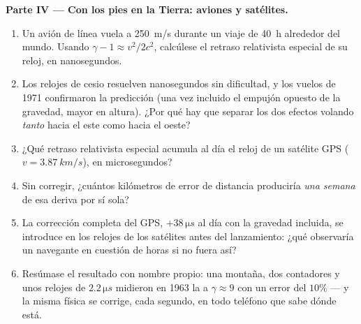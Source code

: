 \begin{problem}
\medskip\noindent\textbf{Parte IV --- Con los pies en la Tierra: aviones y
satélites.}
\begin{enumerate}[resume]
  \item Un avión de línea vuela a \qty{250}{m/s} durante un viaje de
        \qty{40}{h} alrededor del mundo. Usando $\gamma - 1 \approx v^2/2c^2$,
        calcúlese el retraso relativista especial de su reloj, en
        nanosegundos.
  \item Los relojes de cesio resuelven nanosegundos sin dificultad, y
        los vuelos de 1971 confirmaron la predicción (una vez incluido
        el empujón opuesto de la gravedad, mayor en altura). ¿Por qué
        hay que separar los dos efectos volando \emph{tanto} hacia el
        este como hacia el oeste?
  \item ¿Qué retraso relativista especial acumula al día el reloj de un
        satélite GPS ($v = \qty{3.87}{km/s}$), en microsegundos?
  \item Sin corregir, ¿cuántos kilómetros de error de distancia
        produciría \emph{una semana} de esa deriva por sí sola?
  \item La corrección completa del GPS, $+38\,\unit{\micro s}$ al día
        con la gravedad incluida, se introduce en los relojes de los
        satélites antes del lanzamiento: ¿qué observaría un navegante
        en cuestión de horas si no fuera así?
  \item Resúmase el resultado con nombre propio: una montaña, dos
        contadores y unos relojes de $2.2\,\unit{\micro s}$ midieron en
        1963 la  a $\gamma \approx 9$ con un error
        del $10\%$ --- y la misma física se corrige, cada segundo, en
        todo teléfono que sabe dónde está.
\end{enumerate}
\end{problem}

